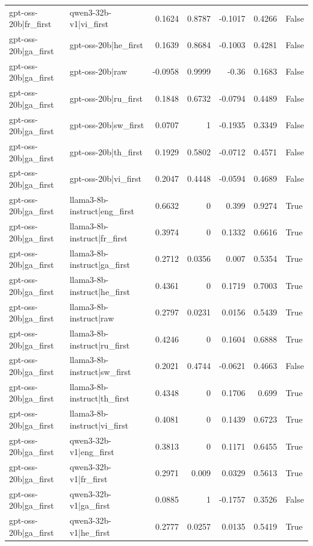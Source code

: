 \begin{table}
\begin{tabular}{l l r r r r l}
gpt-oss-20b|fr_first & qwen3-32b-v1|vi_first & 0.1624 & 0.8787 & -0.1017 & 0.4266 & False \\
gpt-oss-20b|ga_first & gpt-oss-20b|he_first & 0.1639 & 0.8684 & -0.1003 & 0.4281 & False \\
gpt-oss-20b|ga_first & gpt-oss-20b|raw & -0.0958 & 0.9999 & -0.36 & 0.1683 & False \\
gpt-oss-20b|ga_first & gpt-oss-20b|ru_first & 0.1848 & 0.6732 & -0.0794 & 0.4489 & False \\
gpt-oss-20b|ga_first & gpt-oss-20b|sw_first & 0.0707 & 1 & -0.1935 & 0.3349 & False \\
gpt-oss-20b|ga_first & gpt-oss-20b|th_first & 0.1929 & 0.5802 & -0.0712 & 0.4571 & False \\
gpt-oss-20b|ga_first & gpt-oss-20b|vi_first & 0.2047 & 0.4448 & -0.0594 & 0.4689 & False \\
gpt-oss-20b|ga_first & llama3-8b-instruct|eng_first & 0.6632 & 0 & 0.399 & 0.9274 & True \\
gpt-oss-20b|ga_first & llama3-8b-instruct|fr_first & 0.3974 & 0 & 0.1332 & 0.6616 & True \\
gpt-oss-20b|ga_first & llama3-8b-instruct|ga_first & 0.2712 & 0.0356 & 0.007 & 0.5354 & True \\
gpt-oss-20b|ga_first & llama3-8b-instruct|he_first & 0.4361 & 0 & 0.1719 & 0.7003 & True \\
gpt-oss-20b|ga_first & llama3-8b-instruct|raw & 0.2797 & 0.0231 & 0.0156 & 0.5439 & True \\
gpt-oss-20b|ga_first & llama3-8b-instruct|ru_first & 0.4246 & 0 & 0.1604 & 0.6888 & True \\
gpt-oss-20b|ga_first & llama3-8b-instruct|sw_first & 0.2021 & 0.4744 & -0.0621 & 0.4663 & False \\
gpt-oss-20b|ga_first & llama3-8b-instruct|th_first & 0.4348 & 0 & 0.1706 & 0.699 & True \\
gpt-oss-20b|ga_first & llama3-8b-instruct|vi_first & 0.4081 & 0 & 0.1439 & 0.6723 & True \\
gpt-oss-20b|ga_first & qwen3-32b-v1|eng_first & 0.3813 & 0 & 0.1171 & 0.6455 & True \\
gpt-oss-20b|ga_first & qwen3-32b-v1|fr_first & 0.2971 & 0.009 & 0.0329 & 0.5613 & True \\
gpt-oss-20b|ga_first & qwen3-32b-v1|ga_first & 0.0885 & 1 & -0.1757 & 0.3526 & False \\
gpt-oss-20b|ga_first & qwen3-32b-v1|he_first & 0.2777 & 0.0257 & 0.0135 & 0.5419 & True \\

\end{tabular}
\end{table}
